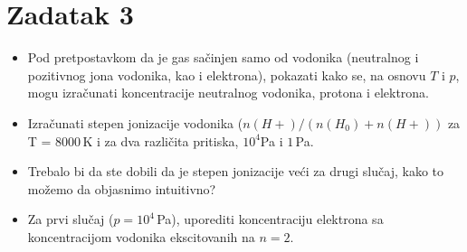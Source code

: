 \documentclass[12pt]{article}
\begin{document}
\section{Zadatak 3}
\begin{itemize}
    \item Pod pretpostavkom da je gas sa\v{c}injen samo od vodonika (neutralnog i pozitivnog jona vodonika, kao i elektrona), pokazati kako se, na osnovu $T$ i $p$, mogu izra\v{c}unati koncentracije neutralnog vodonika, protona i elektrona. 
    \item Izra\v{c}unati stepen jonizacije vodonika ($n(H+) / (n(H_0) + n(H+))$ za T = 8000\,K i za dva razli\v{c}ita pritiska, $10^4$Pa i $1$\,Pa.
    \item Trebalo bi da ste dobili da je stepen jonizacije ve\'{c}i za drugi slu\v{c}aj, kako to mo\v{z}emo da objasnimo intuitivno?
    \item Za prvi slu\v{c}aj ($p=10^4$\,Pa), uporediti koncentraciju elektrona sa koncentracijom vodonika ekscitovanih na $n=2$.
\end{itemize}
\end{document}
